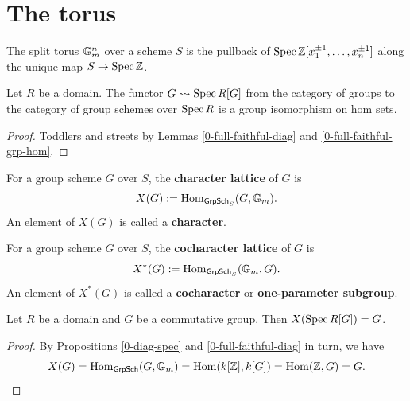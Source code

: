 \section{The torus}


\begin{definition}
  \label{0-torus}
  \leanok

  The split torus ${\mathbb G}_m^n$ over a scheme $S$ is the pullback of
  $\operatorname{Spec} {\mathbb Z}[x_1^{\pm 1}, \dotsc, x_n^{\pm 1}]$ along the unique map $S \to \operatorname{Spec} {\mathbb Z}$.
\end{definition}


\begin{lemma}
  \label{0-diag-hom}
  \leanok

  Let $R$ be a domain.
  The functor $G \rightsquigarrow \operatorname{Spec} R[G]$ from the category of groups to the category of group schemes over $\operatorname{Spec} R$ is a group isomorphism on hom sets.
\end{lemma}
\begin{proof}
  \leanok

  Toddlers and streets by Lemmas \ref{0-full-faithful-diag} and \ref{0-full-faithful-grp-hom}.
\end{proof}


\begin{definition}
  \label{0-char}
  \leanok

  For a group scheme $G$ over $S$, the {\bf character lattice} of $G$ is
  \[
    X(G) := \operatorname{Hom}_{\mathsf{GrpSch}_S}(G, {\mathbb G}_m).
  \]
  An element of $X(G)$ is called a {\bf character}.
\end{definition}


\begin{definition}
  \label{0-cochar}
  \leanok

  For a group scheme $G$ over $S$, the {\bf cocharacter lattice} of $G$ is
  \[
    X^*(G) := \operatorname{Hom}_{\mathsf{GrpSch}_S}({\mathbb G}_m, G).
  \]
  An element of $X^*(G)$ is called a {\bf cocharacter} or {\bf one-parameter subgroup}.
\end{definition}


\begin{proposition}
  \label{0-char-diag}
  \leanok

  Let $R$ be a domain and $G$ be a commutative group.
  Then $X(\operatorname{Spec} R[G]) = G$.
\end{proposition}
\begin{proof}
  \leanok

  By Propositions \ref{0-diag-spec} and \ref{0-full-faithful-diag} in turn, we have
  \[
    X(G) = \operatorname{Hom}_{\mathsf{GrpSch}}(G, {\mathbb G}_m) = \operatorname{Hom}(k[{\mathbb Z}], k[G]) = \operatorname{Hom}({\mathbb Z}, G) = G.
  \]
\end{proof}


